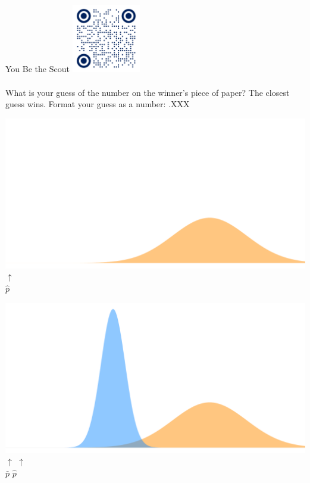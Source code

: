 \documentclass[handout]{beamer}
\begin{document}
  \begin{frame}{You Be the Scout}
    \centering
    \includegraphics[width=3cm]{images/qr_google.png}\\
    ~\\
    What is your guess of the number on the winner's piece of paper? The closest guess wins. Format your guess as a number: .XXX
  \end{frame}

  \begin{frame}
    \includegraphics[width = \textwidth]{images/illustration_1.pdf}\\
    \tabto{73mm}$\uparrow$\\
    \tabto{73mm}$\hat p$
  \end{frame}

  \begin{frame}
    \includegraphics[width = \textwidth]{images/illustration_2.pdf}
    \tabto{38mm}$\uparrow$  \tabto{73mm}$\uparrow$\\
    \tabto{38mm}$\bar p$    \tabto{73mm}$\hat p$
  \end{frame}
\end{document}
